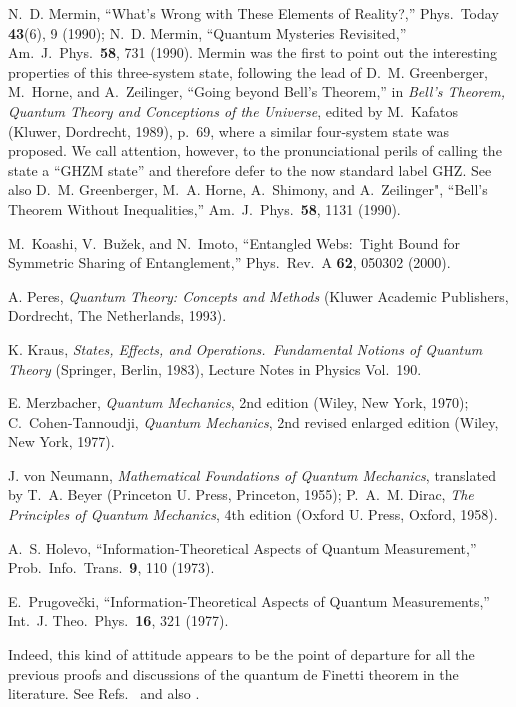 \begin{thebibliography}{10}
N.~D. Mermin, ``What's Wrong with These Elements of Reality?,''
Phys.\ Today {\bf 43}(6), 9 (1990); N.~D. Mermin, ``Quantum
Mysteries Revisited,'' Am.\ J.\ Phys.\ {\bf 58}, 731 (1990). Mermin
was the first to point out the interesting properties of this
three-system state, following the lead of D.~M. Greenberger,
M.~Horne, and A.~Zeilinger, ``Going beyond Bell's Theorem,'' in {\sl
Bell's Theorem, Quantum Theory and Conceptions of the Universe},
edited by M.~Kafatos (Kluwer, Dordrecht, 1989), p.~69, where a
similar four-system state was proposed.  We call attention, however,
to the pronunciational perils of calling the state a ``GHZM state''
and therefore defer to the now standard label GHZ.  See also D.~M.
Greenberger, M.~A. Horne, A.~Shimony, and A.~Zeilinger", ``Bell's
Theorem Without Inequalities,'' Am.\ J.\ Phys.\ {\bf 58}, 1131
(1990).

M.~Koashi, V.~Bu\v{z}ek, and N.~Imoto, ``Entangled Webs:\ Tight Bound
for Symmetric Sharing of Entanglement,'' Phys.\ Rev.\ A {\bf 62},
050302 (2000).

A. Peres, {\sl Quantum Theory: Concepts and Methods\/} (Kluwer
Academic Publishers, Dordrecht, The Netherlands, 1993).

K. Kraus, {\sl States, Effects, and Operations.\ Fundamental Notions
of Quantum Theory\/} (Springer, Berlin, 1983), Lecture Notes in
Physics Vol.\ 190.

E. Merzbacher, {\sl Quantum Mechanics}, 2nd edition (Wiley, New
York, 1970); C.~Cohen-Tannoudji, {\sl Quantum Mechanics}, 2nd revised
enlarged edition (Wiley, New York, 1977).

J. von Neumann, {\sl Mathematical Foundations of Quantum Mechanics},
translated by T.~A. Beyer (Princeton U. Press, Princeton, 1955);
P.~A.~M. Dirac, {\sl The Principles of Quantum Mechanics}, 4th
edition (Oxford U. Press, Oxford, 1958).

A.~S. Holevo, ``Information-Theoretical Aspects of Quantum
Measurement,'' Prob.\ Info.\ Trans.\, {\bf 9}, 110 (1973).

E.~Prugove\v{c}ki, ``Information-Theoretical Aspects of Quantum
Measurements,'' Int.\ J. Theo.\ Phys.\ {\bf 16}, 321 (1977).

Indeed, this kind of attitude appears to be the point of departure
for all the previous proofs and discussions of the quantum de Finetti
theorem in the literature.  See
Refs.~\cite{Hudson1976,Hudson1981,Stormer1969} and also
\cite{DeFinettiLump}.


\end{thebibliography}
